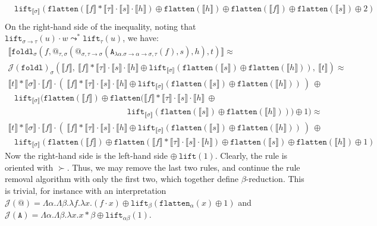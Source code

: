\documentclass[a4paper,UKenglish,cleveref,autoref,numberwithinsect]{lipics-v2019}
\theoremstyle{definition}
\newcommand{\arrtype}{\rightarrow}
\newcommand{\abs}[2]{\lambda #1.#2}
\newcommand{\arrW}{\leadsto}
\newcommand{\flatten}{\mathtt{flatten}}
\newcommand{\lift}{\mathtt{lift}}
\newcommand{\typeinterpret}[1]{\llbracket #1 \rrbracket}
\newcommand{\interpret}[1]{\llbracket #1 \rrbracket}
\newcommand{\Termmap}{\mathcal{J}}
\begin{document}
\begin{example}
\[\begin{array}{l}
\phantom{A}
\lift_{\typeinterpret{\sigma}}(\flatten(\interpret{f} * \typeinterpret{
\tau} \cdot \interpret{s} \cdot \interpret{h}) \oplus
\flatten(\interpret{h}) \oplus
\flatten(\interpret{f}) \oplus\flatten(\interpret{s}) \oplus 2) \\
\end{array}
\]
On the right-hand side of the inequality, noting that
$\lift_{\sigma \arrtype \tau}(u) \cdot w \arrW^*
\lift_{\tau}(u)$, we have:
\[
\begin{array}{l}
\interpret{\mathtt{foldl}_\sigma(f,@_{\tau,\sigma}(@_{\sigma,\tau
    \arrtype\sigma}(
      \mathtt{A}_{\abs{\alpha}{\sigma\arrtype\alpha\arrtype\sigma},
      \tau}(f),s),h),t)} \approx \\
\Termmap(\mathtt{foldl})_\sigma(\interpret{f},\
  \interpret{f} * \typeinterpret{\tau} \cdot \interpret{s} \cdot
  \interpret{h} \oplus \lift_{\typeinterpret{\sigma}}(\flatten(\interpret{s})
  \oplus \flatten(\interpret{h})),\ \interpret{t}) \approx \\
\interpret{t} * \typeinterpret{\sigma} \cdot \interpret{f} \cdot
  (\ \interpret{f} * \typeinterpret{\tau} \cdot \interpret{s} \cdot
  \interpret{h} \oplus \lift_{\typeinterpret{\sigma}}(\flatten(\interpret{s})
  \oplus \flatten(\interpret{h}))\ )\ \oplus \\
\phantom{A}
  \lift_{\typeinterpret{\sigma}}(\flatten(\interpret{f}) \oplus
  \flatten(\interpret{f} * \typeinterpret{\tau} \cdot \interpret{s} \cdot
  \interpret{h}\ \oplus \\
  \phantom{ABCDEFGHIJKLMNOPQRSt}
  \lift_{\typeinterpret{\sigma}}(\flatten(\interpret{s})
  \oplus \flatten(\interpret{h}))) \oplus 1) \approx \\
\interpret{t} * \typeinterpret{\sigma} \cdot \interpret{f} \cdot
  (\ \interpret{f} * \typeinterpret{\tau} \cdot \interpret{s} \cdot
  \interpret{h} \oplus \lift_{\typeinterpret{\sigma}}(\flatten(\interpret{s})
  \oplus \flatten(\interpret{h}))\ )\ \oplus \\
\phantom{A}
  \lift_{\typeinterpret{\sigma}}(\flatten(\interpret{f}) \oplus
  \flatten(\interpret{f} * \typeinterpret{\tau} \cdot \interpret{s} \cdot
  \interpret{h}) \oplus \flatten(\interpret{s}) \oplus \flatten(\interpret{h}) \oplus 1)
\end{array}
\]
Now the right-hand side is the left-hand side $\oplus\ \lift(1)$.
Clearly, the rule is oriented with $\succ$.  Thus, we may remove the
last two rules, and continue the rule removal algorithm with only the
first two, which together define $\beta$-reduction.  This is trivial,
for instance with an interpretation
$\Termmap(@) = \Lambda \alpha.\Lambda \beta.\lambda f.\lambda x.
(f \cdot x) \oplus \lift_\beta(\flatten_\alpha(x) \oplus 1)$ and
$\Termmap(\mathtt{A}) = \Lambda \alpha.\Lambda \beta.\lambda x.
x * \beta \oplus \lift_{\alpha\beta}(1)$.
\end{example}
\end{document}
